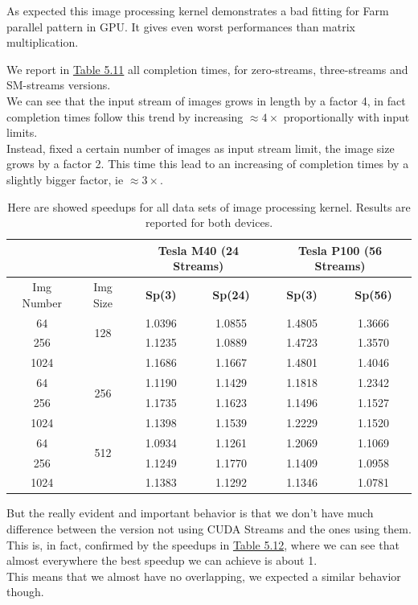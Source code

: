 As expected this image processing kernel demonstrates a bad fitting for Farm parallel pattern in GPU. It gives even worst performances than matrix multiplication.

We report in \hyperref[tab:imgavgs]{Table 5.11} all completion times, for zero-streams, three-streams and SM-streams versions.\\
We can see that the input stream of images grows in length by a factor 4, in fact completion times follow this trend by increasing \(\approx4\times\) proportionally with input limits.\\
Instead, fixed a certain number of images as input stream limit, the image size grows by a factor 2. This time this lead to an increasing of completion times by a slightly bigger factor, ie \(\approx3\times\).


\begin{table}	
	\centering
	\begin{tabular}{ | c  c || c | c  || c | c || } 
		\hline
		& &  \multicolumn{2}{c}{\textbf{Tesla M40 (24 Streams)}}& \multicolumn{2}{c}{\textbf{Tesla P100 (56 Streams)}} \\ [0.5ex]
		\hline		
		Img Number &	Img Size&	\textbf{Sp(3)} & \textbf{Sp(24)} &	\textbf{Sp(3)} &	\textbf{Sp(56)}\\
		\hline	\hline	
		64&	\multirow{2}{*}{128}&	1.0396&	1.0855&	1.4805&	1.3666\\
		256&	&	1.1235&	1.0889&	1.4723&	1.3570\\
		1024&	&	1.1686&	1.1667&	1.4801&	1.4046\\
		64&	\multirow{2}{*}{256}&	1.1190&	1.1429&	1.1818&	1.2342\\
		256&	&	1.1735&	1.1623&	1.1496&	1.1527\\
		1024&	&	1.1398&	1.1539&	1.2229&	1.1520\\
		64&	\multirow{2}{*}{512}&	1.0934&	1.1261&	1.2069&	1.1069\\
		256&	&	1.1249&	1.1770&	1.1409&	1.0958\\
		1024&	&	1.1383&	1.1292&	1.1346&	1.0781\\
		\hline
	\end{tabular}
	\caption{Here are showed speedups for all data sets of image processing kernel. Results are reported for both devices.}	
	\label{tab:imgspeedup}		
\end{table}


But the really evident and important behavior is that we don't have much difference between the version not using CUDA Streams and the ones using them.\\
This is, in fact, confirmed by the speedups in \hyperref[tab:imgspeedup]{Table 5.12}, where we can see that almost everywhere the best speedup we can achieve is about 1.\\
This means that we almost have no overlapping, we expected a similar behavior though.\\




